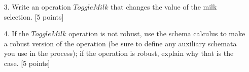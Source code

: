 \documentclass[12pt,fleqn]{article}
\begin{document}
\begin{enumerate}
\begin{enumerate}

\clearpage

\item[3.] Write an operation $ToggleMilk$ that changes the value of the milk selection. [5 points]

\vspace{3in} %


\item[4.] If the $ToggleMilk$ operation is not robust, use the schema calculus to make a robust version of the operation (be sure to define any auxiliary schemata you use in the process); if the operation is robust, explain why that is the case. [5 points]





\end{enumerate}

\end{enumerate}
\end{document}
